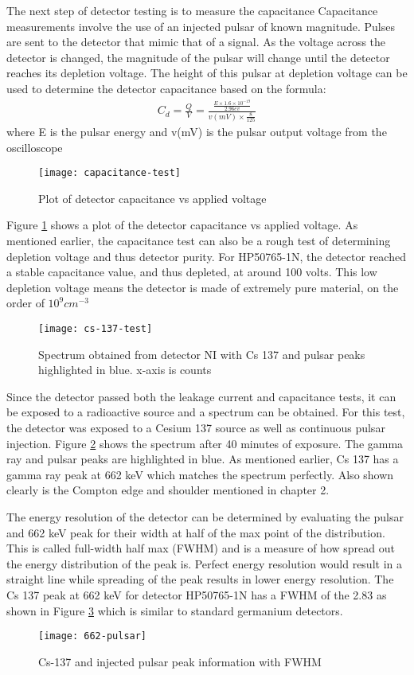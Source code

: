 The next step of detector testing is to measure the capacitance
Capacitance measurements involve the use of an injected pulsar of known magnitude.
Pulses are sent to the detector that mimic that of a signal.
As the voltage across the detector is changed, the magnitude of the pulsar will change until the detector reaches its depletion voltage.
The height of this pulsar at depletion voltage can be used to determine the detector capacitance based on the formula:
\begin{align*}
C_d=\frac{Q}{V}=\frac{\frac{E\times 1.6\times 10^{-19}}{2.96ev}}{v(mV)\times \frac{8}{125}}
\end{align*}
where E is the pulsar energy and v(mV) is the pulsar output voltage from the oscilloscope

\begin{figure}[htpb]
\centering
\texttt{[image: capacitance-test]}
\caption{Plot of detector capacitance vs applied voltage}
\label{fig:capacitance-test}
\end{figure}
Figure \ref{fig:capacitance-test} shows a plot of the detector capacitance vs applied voltage.
As mentioned earlier, the capacitance test can also be a rough test of determining depletion voltage and thus detector purity.
For HP50765-1N, the detector reached a stable capacitance value, and thus depleted, at around 100 volts.
This low depletion voltage means the detector is made of extremely pure material, on the order of $10^{9}cm^{-3}$

\begin{figure}[htpb]
\centering
\texttt{[image: cs-137-test]}
\caption{Spectrum obtained from detector NI with Cs 137 and pulsar peaks highlighted in blue. x-axis is counts}
\label{fig:cs-137-test}
\end{figure}
Since the detector passed both the leakage current and capacitance tests, it can be exposed to a radioactive source and a spectrum can be obtained.
For this test, the detector was exposed to a Cesium 137 source as well as continuous pulsar injection.
Figure \ref{fig:cs-137-test} shows the spectrum after 40 minutes of exposure.
The gamma ray and pulsar peaks are highlighted in blue.
As mentioned earlier, Cs 137 has a gamma ray peak at 662 keV which matches the spectrum perfectly.
Also shown clearly is the Compton edge and shoulder mentioned in chapter 2.

The energy resolution of the detector can be determined by evaluating the pulsar and 662 keV peak for their width at half of the max point of the distribution.
This is called full-width half max (FWHM) and is a measure of how spread out the energy distribution of the peak is.
Perfect energy resolution would result in a straight line while spreading of the peak results in lower energy resolution.
The Cs 137 peak at 662 keV for detector HP50765-1N has a FWHM of the 2.83 as shown in Figure \ref{fig:662-pulsar} which is similar to standard germanium detectors.
\begin{figure}[htpb]
\centering
\texttt{[image: 662-pulsar]}
\caption{Cs-137 and injected pulsar peak information with FWHM}
\label{fig:662-pulsar}
\end{figure}


